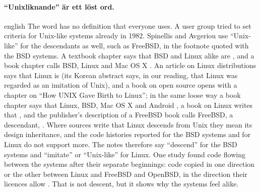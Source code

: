 \paragraph{%
  {\enquote{Unixliknande} är ett löst ord.}} %
\begin{onlyin}{english} %
The word has no definition that everyone uses.
A user group tried to set criteria for Unix-like systems already in
1982\autocite{Mason1982Criteria}.
Spinellis and Avgeriou use \enquote{Unix-like} for the descendants as
well, such as FreeBSD, in the footnote quoted with the BSD systems.
A textbook chapter says that BSD and Linux alike are
,
and a book chapter calls BSD, Linux and Mac OS X
.
An article on Linux distributions says that Linux is
 (its Korean abstract says, in our reading, that Linux
was regarded as an imitation of Unix), and a book on open source
opens with a chapter on \enquote{How UNIX Gave Birth to
Linux}\autocite{Meeker2008OpenSource}; in the same loose way a book
chapter says that Linux, BSD, Mac OS X and Android
, a book on Linux
writes that , and the
publisher's description of a FreeBSD book calls FreeBSD, a descendant,
.
Where sources write that Linux descends from Unix they mean its design
inheritance, and the code histories reported for the BSD systems and
for Linux do not support more.
The notes therefore say \enquote{descend} for the BSD systems and
\enquote{imitate} or \enquote{Unix-like} for Linux.
One study found code flowing between the systems after their separate
beginnings: code copied in one direction or the other between Linux and
FreeBSD and OpenBSD, in the direction their licences allow%
\autocite{German2009Siblings}.
That is not descent, but it shows why the systems feel alike.
\end{onlyin}
